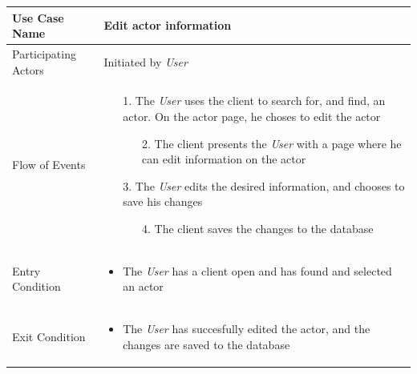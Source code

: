 \begin{center}
	\begin{tabular}{ | l | p{10cm} |  }
		 \hline
		Use Case Name & Edit actor information \\ \hline
		Participating Actors & Initiated by \emph{User} \\ \hline
		Flow of Events & \begin{enumerate}
						\item[1.] The \emph{User} uses the client to search for, and find, an actor. On the actor page, he choses to edit the actor
						\begin{enumerate}
							\item[2.] The client presents the \emph{User} with a page where he can edit information on the actor
						\end{enumerate}
						\item[3.] The \emph{User} edits the desired information, and chooses to save his changes
						\begin{enumerate}
							\item[4.] The client saves the changes to the database
						\end{enumerate}
					\end{enumerate} \\ \hline
		Entry Condition & \begin{itemize}
						\item The \emph{User} has a client open and has found and selected an actor
					\end{itemize} \\ \hline
		Exit Condition & \begin{itemize}
						\item The \emph{User} has succesfully edited the actor, and the changes are saved to the database
					\end{itemize} \\
		\hline
	\end{tabular}
\end{center}



